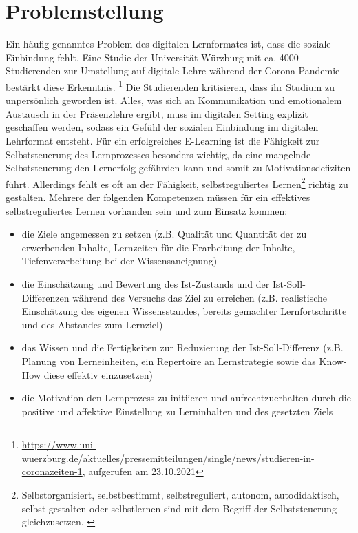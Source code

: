 \section{Problemstellung} \label{Problemstellung}
Ein häufig genanntes Problem des digitalen Lernformates ist, dass die soziale Einbindung fehlt.
Eine Studie der Universität Würzburg mit ca. 4000 Studierenden zur Umstellung auf digitale Lehre während der Corona Pandemie bestärkt diese Erkenntnis. 
\footnote{\url{https://www.uni-wuerzburg.de/aktuelles/pressemitteilungen/single/news/studieren-in-coronazeiten-1}, aufgerufen am 23.10.2021}
Die Studierenden kritisieren, dass ihr Studium zu unpersönlich geworden ist. Alles, was sich an Kommunikation und emotionalem Austausch in der Präsenzlehre ergibt, muss im digitalen Setting explizit geschaffen werden, sodass ein Gefühl der sozialen Einbindung 
im digitalen Lehrformat entsteht. \parencite[90]{Uemminghaus.2021} 
Für ein erfolgreiches E-Learning ist die Fähigkeit zur Selbststeuerung des Lernprozesses besonders wichtig, da eine mangelnde Selbststeuerung den Lernerfolg gefährden kann und somit zu 
Motivationsdefiziten führt. \parencite[13]{berlinger.2002} \parencite[1]{weck.2020} 
Allerdings fehlt es oft an der Fähigkeit, selbstreguliertes Lernen\footnote{ Selbstorganisiert, selbstbestimmt, selbstreguliert, autonom, autodidaktisch, selbst gestalten oder selbstlernen sind mit dem Begriff der Selbststeuerung gleichzusetzen. \parencite[14 f.]{Dietrich.2007}} richtig zu gestalten. \parencite[1]{weck.2020} 
Mehrere der folgenden Kompetenzen müssen für ein effektives selbstreguliertes Lernen vorhanden sein und zum Einsatz kommen:
\begin{itemize}
    \item die Ziele angemessen zu setzen (z.B. Qualität und Quantität der zu erwerbenden Inhalte, Lernzeiten für die Erarbeitung der Inhalte, Tiefenverarbeitung bei der Wissensaneignung)
    \item die Einschätzung und Bewertung des Ist-Zustands und der Ist-Soll-Differenzen während des Versuchs das Ziel zu erreichen (z.B. realistische Einschätzung des eigenen Wissensstandes, bereits gemachter Lernfortschritte und des Abstandes zum Lernziel)
    \item das Wissen und die Fertigkeiten zur Reduzierung der Ist-Soll-Differenz (z.B. Planung von Lerneinheiten, ein Repertoire an Lernstrategie sowie das Know-How diese effektiv einzusetzen)
    \item die Motivation den Lernprozess zu initiieren und aufrechtzuerhalten durch die positive und affektive Einstellung zu Lerninhalten und des gesetzten Ziels
\end{itemize}
